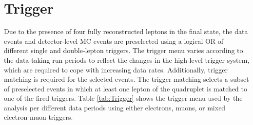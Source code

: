 \section{Trigger}
\label{sec:Trigger}

Due to the presence of four fully reconstructed leptons in the final state, the data events and detector-level MC events are preselected using a logical OR of different single and double-lepton triggers. The trigger menu varies according to the data-taking run periods to reflect the changes in the high-level trigger system, which are required to cope with increasing data rates. Additionally, trigger matching is required for the selected events. The trigger matching selects a subset of preselected events in which at least one lepton of the quadruplet is matched to one of the fired triggers. Table \ref{tab:Trigger} shows the trigger menu used by the analysis per different data periods using either electrons, muons, or mixed electron-muon triggers.

